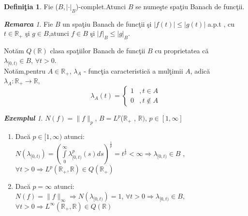 \documentclass[ a4paper, 12pt]{report}
\theoremstyle{definition}
\newtheorem{definition}{\bf Defini\c tia}[section]
\theoremstyle{remark}
\newtheorem{remarc}{\bf Remarca}[section]
\newtheorem{exemple}{\bf Exemplul}[section]
\numberwithin{equation}{section}
\begin{document}
\begin{definition}
Fie ($B,\lvert \cdot \rvert_B$)-complet.Atunci $B$ se nume\c ste spa\c tiu Banach de func\c tii.
\end{definition}
\begin{remarc}
Fie $B$ un spa\c tiu Banach de func\c tii \c si $\lvert f(t)\rvert \leqslant \lvert g(t)\rvert$ a.p.t , cu $t \in \mathbb{R}_+$ \c si $g \in B$,atunci $f \in B$ \c si $\vert f \rvert_B \leqslant \lvert g \rvert_B$. 
\end{remarc}
Not\u am $Q(\mathbb{R})$ clasa spa\c tiilor Banach de func\c tii $B$ cu proprietatea c\u a\\ $\lambda_{[0,t)} \in B$, $ \forall t>0$.\\
Not\u am,pentru $ A \in \mathbb{R}_+ $, $\lambda_A$ - func\c tia caracteristic\u a a mul\c timii $A$, adic\u a\\ $ \lambda_A : \mathbb{R}_+ \rightarrow \mathbb{R}$,
\begin{equation*}
\lambda_A (t)=
\begin{cases}
1 &, t \in A \\
0 &, t \notin A
\end{cases}
\end{equation*}
\begin{exemple}
$ N(f) = \lVert f \rVert_p$, $B = L^p$($\mathbb{R}_+$ , $\mathbb{R})$, $p \in [1,\infty]$ \\
\begin{enumerate}
\item Dac\u a $ p \in [1,\infty)$ atunci:\\
$N(\lambda_{[0,t)})=(\int\limits_{0}^{\infty} \lambda_{[0,t)}^p (s)  ds)^ \frac{1}{p} = t^\frac{1}{p}<\infty \Rightarrow \lambda_{[0,t)}\in B$ , $\forall t>0 \Rightarrow L^p (\mathbb{R}_+,\mathbb{R}) \in Q(\mathbb{R}_+)$\\
\item Dac\u a $p = \infty $ atunci:\\
$N(f) = \lVert f \rVert_{\infty} \Rightarrow N(\lambda_{[0,t)}) = 1$, $\forall t> 0 \Rightarrow \lambda_{[0,t)} \in B$, $\forall t>0 \Rightarrow L^{\infty}(\mathbb{R}_+ , \mathbb{R}) \in Q(\mathbb{R})$ \\
\end{enumerate}
\end{exemple}
\end{document}
